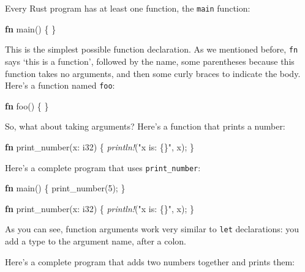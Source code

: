 \documentclass[a4paper,]{book}
\newenvironment{Shaded}{\begin{snugshade}}{\end{snugshade}}
\newcommand{\KeywordTok}[1]{\textcolor[rgb]{0.13,0.29,0.53}{\textbf{{#1}}}}
\newcommand{\DataTypeTok}[1]{\textcolor[rgb]{0.13,0.29,0.53}{{#1}}}
\newcommand{\DecValTok}[1]{\textcolor[rgb]{0.00,0.00,0.81}{{#1}}}
\newcommand{\StringTok}[1]{\textcolor[rgb]{0.31,0.60,0.02}{{#1}}}
\newcommand{\PreprocessorTok}[1]{\textcolor[rgb]{0.56,0.35,0.01}{\textit{{#1}}}}
\newcommand{\NormalTok}[1]{{#1}}
\begin{document}
Every Rust program has at least one function, the \texttt{main}
function:

\begin{Shaded}
\begin{Highlighting}[]
\KeywordTok{fn} \NormalTok{main() \{}
\NormalTok{\}}
\end{Highlighting}
\end{Shaded}

This is the simplest possible function declaration. As we mentioned
before, \texttt{fn} says `this is a function', followed by the name,
some parentheses because this function takes no arguments, and then some
curly braces to indicate the body. Here's a function named \texttt{foo}:

\begin{Shaded}
\begin{Highlighting}[]
\KeywordTok{fn} \NormalTok{foo() \{}
\NormalTok{\}}
\end{Highlighting}
\end{Shaded}

So, what about taking arguments? Here's a function that prints a number:

\begin{Shaded}
\begin{Highlighting}[]
\KeywordTok{fn} \NormalTok{print_number(x: }\DataTypeTok{i32}\NormalTok{) \{}
    \PreprocessorTok{println!}\NormalTok{(}\StringTok{"x is: \{\}"}\NormalTok{, x);}
\NormalTok{\}}
\end{Highlighting}
\end{Shaded}

Here's a complete program that uses \texttt{print\_number}:

\begin{Shaded}
\begin{Highlighting}[]
\KeywordTok{fn} \NormalTok{main() \{}
    \NormalTok{print_number(}\DecValTok{5}\NormalTok{);}
\NormalTok{\}}

\KeywordTok{fn} \NormalTok{print_number(x: }\DataTypeTok{i32}\NormalTok{) \{}
    \PreprocessorTok{println!}\NormalTok{(}\StringTok{"x is: \{\}"}\NormalTok{, x);}
\NormalTok{\}}
\end{Highlighting}
\end{Shaded}

As you can see, function arguments work very similar to \texttt{let}
declarations: you add a type to the argument name, after a colon.

Here's a complete program that adds two numbers together and prints
them:
\end{document}
